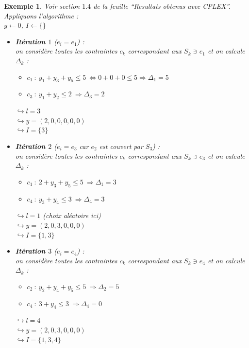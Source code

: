 \documentclass{article}
\newtheorem{exemple}{Exemple}[section]
\begin{document}
\begin{sffamily}
\begin{exemple}
Voir section $1.4$ de la feuille ``Resultats obtenus avec CPLEX''. Appliquons
l'algorithme : \\
\indent $y \leftarrow 0$, $I \leftarrow \{\}$
\begin{itemize}
\item \textbf{Itération $1$} ($e_i = e_1$) :\\
on considère toutes les contraintes $c_k$ correspondant aux $S_k \ni e_1$ et on
calcule $\Delta_k$ :
	\begin{itemize}
	\item $c_1\ :\ y_1+y_3+y_5 \leq 5\ \Leftrightarrow 0+0+0\leq 5 \Rightarrow
    \Delta_1 = 5$
	\item $c_3\ :\ y_1+y_2 \leq 2\ \Rightarrow \Delta_3 = 2$
	\end{itemize}
	$\hookrightarrow l = 3$ \\
	$\hookrightarrow y = (2,0,0,0,0,0)$\\
	$\hookrightarrow I = \{3\}$\\
\item \textbf{Itération $2$} ($e_i = e_3$ car $e_2$ est couvert par $S_3$) :\\
on considère toutes les contraintes $c_k$ correspondant aux $S_k \ni e_3$ et on
calcule $\Delta_k$ :
	\begin{itemize}
	\item $c_1\ :\ 2+y_3+y_5 \leq 5\ \Rightarrow \Delta_1 = 3$
	\item $c_4\ :\ y_3+y_4 \leq 3\ \Rightarrow \Delta_4 = 3$
	\end{itemize}
	$\hookrightarrow l = 1$ (choix aléatoire ici)\\
	$\hookrightarrow y = (2,0,3,0,0,0)$\\
	$\hookrightarrow I = \{1,3\}$\\
\item \textbf{Itération $3$} ($e_i = e_4$) :\\
on considère toutes les contraintes $c_k$ correspondant aux $S_k \ni e_4$ et on
calcule $\Delta_k$ :
	\begin{itemize}
	\item $c_2\ :\ y_2+y_4+y_5 \leq 5\ \Rightarrow \Delta_2 = 5$
	\item $c_4\ :\ 3+y_4 \leq 3\ \Rightarrow \Delta_4 = 0$
	\end{itemize}
	$\hookrightarrow l = 4$\\
	$\hookrightarrow y = (2,0,3,0,0,0)$\\
	$\hookrightarrow I = \{1,3,4\}$ \\

\end{itemize}
\end{exemple}
\end{sffamily}
\end{document}
